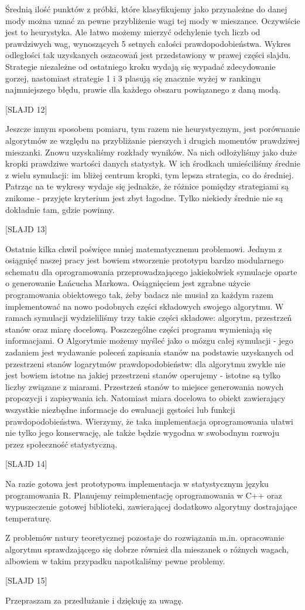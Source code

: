 Średnią ilość punktów z próbki, które klasyfikujemy jako przynależne do danej mody można uznać za pewne przybliżenie wagi tej mody w mieszance. Oczywiście jest to heurystyka. Ale łatwo możemy mierzyć odchylenie tych liczb od prawdziwych wag, wynoszących 5 setnych całości prawdopodobieństwa. Wykres odległości tak uzyskanych oszacowań jest przedstawiony w prawej części slajdu. Strategie niezależne od ostatniego kroku wydają się wypadać zdecydowanie gorzej, nastomiast strategie 1 i 3 plasują się znacznie wyżej w rankingu najmniejszego błędu, prawie dla każdego obszaru powiązanego z daną modą.

[SLAJD 12]

Jeszcze innym sposobem pomiaru, tym razem nie heurystycznym, jest porównanie algorytmów ze względu na przybliżanie pierszych i drugich momentów prawdziwej mieszanki. Znowu uzyskaliśmy rozkłady wyników. Na nich odłożyliśmy jako duże kropki prawdziwe wartości danych statystyk. W ich środkach umieściliśmy średnie z wielu symulacji: im bliżej centrum kropki, tym lepsza strategia, co do średniej. Patrząc na te wykresy wydaje się jednakże, że różnice pomiędzy strategiami są znikome - przyjęte kryterium jest zbyt łagodne. Tylko niekiedy średnie nie są dokładnie tam, gdzie powinny. 

[SLAJD 13]

Ostatnie kilka chwil poświęce mniej matematycznemu problemowi. Jednym z osiągnięć naszej pracy jest bowiem stworzenie prototypu bardzo modularnego schematu dla oprogramowania przeprowadzającego jakiekolwiek symulacje oparte o generowanie Łańcucha Markowa. Osiągnięciem jest zgrabne użycie programowania obiektowego tak, żeby badacz nie musiał za każdym razem implementować na nowo podobnych części składowych swojego algorytmu. W ramach symulacji wydzieliliśmy trzy takie części składowe: algorytm, przestrzeń stanów oraz miarę docelową. Poszczególne części programu wymieniają się informacjami. O Algorytmie możemy myśleć jako o mózgu całej symulacji - jego zadaniem jest wydawanie poleceń zapisania stanów na podstawie uzyskanych od przestrzeni stanów logarytmów prawdopodobieństw: dla algorytmu zwykle nie jest bowiem istotne na jakiej przestrzeni stanów operujemy - istotne są tylko liczby związane z miarami.  Przestrzeń stanów to miejsce generowania nowych propozycji i zapisywania ich. Natomiast miara docelowa to obiekt zawierający wszystkie niezbędne informacje do ewaluacji gęstości lub funkcji prawdopodobieństwa. Wierzymy, że taka implementacja oprogramowania ułatwi nie tylko jego konserwację, ale także będzie wygodna w swobodnym rozwoju przez społeczność statystyczną. 

[SLAJD 14]

Na razie gotowa jest prototypowa implementacja w statystycznym języku programowania R. Planujemy reimplementację oprogramowania w C++ oraz wypuszeczenie gotowej biblioteki, zawierającej dodatkowo algorytmy dostrajające temperaturę. 

Z problemów natury teoretycznej pozostaje do rozwiązania m.in. opracowanie algorytmu sprawdzającego się dobrze również dla mieszanek o różnych wagach, albowiem w takim przypadku napotkaliśmy pewne problemy. 

[SLAJD 15]

Przepraszam za przedłużanie i dziękuję za uwagę.
